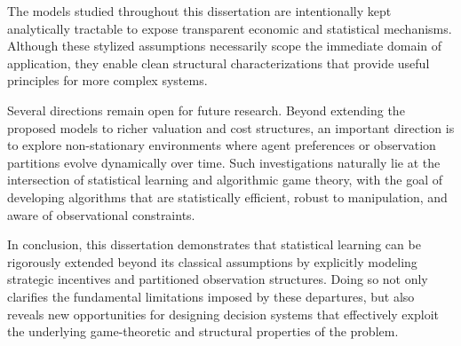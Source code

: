 The models studied throughout this dissertation are intentionally kept analytically tractable to expose transparent economic and statistical mechanisms. Although these stylized assumptions necessarily scope the immediate domain of application, they enable clean structural characterizations that provide useful principles for more complex systems.

Several directions remain open for future research. Beyond extending the proposed models to richer valuation and cost structures, an important direction is to explore non-stationary environments where agent preferences or observation partitions evolve dynamically over time. Such investigations naturally lie at the intersection of statistical learning and algorithmic game theory, with the goal of developing algorithms that are statistically efficient, robust to manipulation, and aware of observational constraints.

In conclusion, this dissertation demonstrates that statistical learning can be rigorously extended beyond its classical assumptions by explicitly modeling strategic incentives and partitioned observation structures. Doing so not only clarifies the fundamental limitations imposed by these departures, but also reveals new opportunities for designing decision systems that effectively exploit the underlying game-theoretic and structural properties of the problem.
